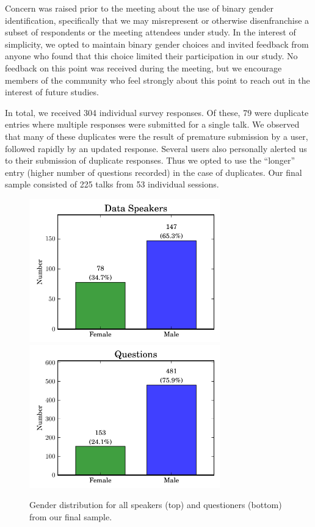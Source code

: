 \documentclass[iop]{emulateapj}
\begin{document}
Concern was raised prior to the meeting about the use of binary gender identification, specifically that we may misrepresent or otherwise disenfranchise a subset of respondents or the meeting attendees under study.  In the interest of simplicity, we opted to maintain binary gender choices and invited feedback from anyone who found that this choice limited their participation in our study. No feedback on this point was received during the meeting, but we encourage members of the community who feel strongly about this point to reach out in the interest of future studies.

In total, we received 304 individual survey responses. Of these, 79 were duplicate entries where multiple responses were submitted for a single talk. We observed that many of these duplicates were the result of premature submission by a user, followed rapidly by an updated response. Several users also personally alerted us to their submission of duplicate responses. Thus we opted to use the ``longer'' entry (higher number of questions recorded) in the case of duplicates. Our final sample consisted of 225 talks from 53 individual sessions.




\begin{figure}[!t]
\centering
\includegraphics[width=3.25in]{speakers_data}
\includegraphics[width=3.25in]{questions}
\caption{Gender distribution for all speakers (top) and questioners (bottom) from our final sample.}
\label{fig:q}
\end{figure}
\end{document}
